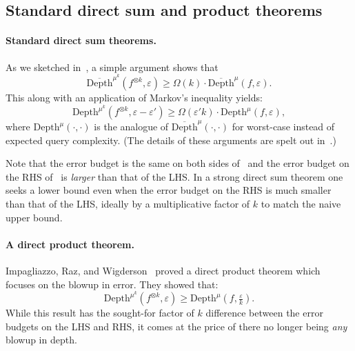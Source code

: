 \documentclass[11pt]{article}
\begin{document}
\subsection{Standard direct sum and product theorems}

\paragraph{Standard direct sum theorems.} 

As we sketched in~, a simple argument shows that 
\begin{equation}
\overline{\mathrm{Depth}}^{\mu^k}(f^{\otimes k},\varepsilon) \ge \Omega(k) \cdot \overline{\mathrm{Depth}}^{\mu}(f,\varepsilon). \label{eq:BDK}
\end{equation} 
This along with an application of Markov's inequality yields: 
\begin{equation}
\mathrm{Depth}^{\mu^k}(f^{\otimes k},\varepsilon-\varepsilon') \ge \Omega(\varepsilon'k)\cdot \mathrm{Depth}^{\mu}(f,\varepsilon),    \label{eq:JKS}
\end{equation}
where $\mathrm{Depth}^{\mu}(\cdot ,\cdot)$ is the analogue of $\overline{\mathrm{Depth}}^{\mu}(\cdot,\cdot)$ for worst-case instead of expected query complexity. (The details of these arguments are spelt out in~\cite{JKS10,BDK18}.) 



Note that the error budget is the same on both sides of~ and the error budget on the RHS of~ is {\sl larger} than that of the LHS. In a strong direct sum theorem one seeks a lower bound even when the error budget on the RHS is much smaller than that of the LHS, ideally by a multiplicative factor of $k$ to match the naive upper bound.


\paragraph{A direct product theorem.} Impagliazzo, Raz, and Wigderson~\cite{IRW94} proved a direct product theorem which focuses on the blowup in error.  They showed that: 
\begin{equation} \mathrm{Depth}^{\mu^k}(f^{\otimes k},\varepsilon) \ge  \mathrm{Depth}^{\mu}(f,\tfrac{\varepsilon}{k}).\label{eq:IRW}
\end{equation}
While this result has the sought-for factor of $k$ difference between the error budgets on the LHS and RHS, it comes at the price of there no longer being {\sl any} blowup in depth. 
 
\end{document}

